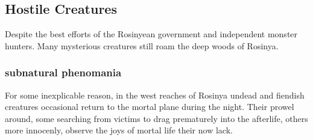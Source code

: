 \documentclass[../main.tex]{subfiles}
\begin{document}
\subsection{Hostile Creatures}
Despite the best efforts of the Rosinyean government and independent monster hunters.
Many mysterious creatures still roam the deep woods of Rosinya.   

\subsubsection{subnatural phenomania}
For some inexplicable reason, in the west reaches of Rosinya undead and fiendish 
creatures occasional return to the mortal plane during the night. Their prowel around, 
some searching from victims to drag prematurely into the afterlife, others more 
innocenly, observe the joys of mortal life their now lack. 
\end{document}
